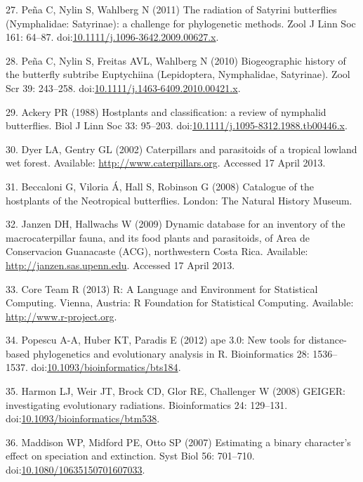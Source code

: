\documentclass[10pt]{article}
\begin{document}
27. Pe\~na C, Nylin S, Wahlberg N (2011) The radiation of Satyrini
butterflies (Nymphalidae: Satyrinae): a challenge for phylogenetic
methods. Zool J Linn Soc 161: 64--87.
doi:\href{http://dx.doi.org/10.1111/j.1096-3642.2009.00627.x}{10.1111/j.1096-3642.2009.00627.x}.

28. Pe\~na C, Nylin S, Freitas AVL, Wahlberg N (2010) Biogeographic
history of the butterfly subtribe Euptychiina (Lepidoptera, Nymphalidae,
Satyrinae). Zool Scr 39: 243--258.
doi:\href{http://dx.doi.org/10.1111/j.1463-6409.2010.00421.x}{10.1111/j.1463-6409.2010.00421.x}.

29. Ackery PR (1988) Hostplants and classification: a review of
nymphalid butterflies. Biol J Linn Soc 33: 95--203.
doi:\href{http://dx.doi.org/10.1111/j.1095-8312.1988.tb00446.x}{10.1111/j.1095-8312.1988.tb00446.x}.

30. Dyer LA, Gentry GL (2002) Caterpillars and parasitoids of a tropical
lowland wet forest. Available: \url{http://www.caterpillars.org}.
Accessed 17 April 2013.

31. Beccaloni G, Viloria \'A, Hall S, Robinson G (2008) Catalogue of the
hostplants of the Neotropical butterflies. London: The Natural History
Museum.

32. Janzen DH, Hallwachs W (2009) Dynamic database for an inventory of
the macrocaterpillar fauna, and its food plants and parasitoids, of Area
de Conservacion Guanacaste (ACG), northwestern Costa Rica. Available:
\url{http://janzen.sas.upenn.edu}. Accessed 17 April 2013.

33. Core Team R (2013) R: A Language and Environment for Statistical
Computing. Vienna, Austria: R Foundation for Statistical Computing.
Available: \url{http://www.r-project.org}.

34. Popescu A-A, Huber KT, Paradis E (2012) ape 3.0: New tools for
distance-based phylogenetics and evolutionary analysis in R.
Bioinformatics 28: 1536--1537.
doi:\href{http://dx.doi.org/10.1093/bioinformatics/bts184}{10.1093/bioinformatics/bts184}.

35. Harmon LJ, Weir JT, Brock CD, Glor RE, Challenger W (2008) GEIGER:
investigating evolutionary radiations. Bioinformatics 24: 129--131.
doi:\href{http://dx.doi.org/10.1093/bioinformatics/btm538}{10.1093/bioinformatics/btm538}.

36. Maddison WP, Midford PE, Otto SP (2007) Estimating a binary
character's effect on speciation and extinction. Syst Biol 56: 701--710.
doi:\href{http://dx.doi.org/10.1080/10635150701607033}{10.1080/10635150701607033}.
\end{document}
